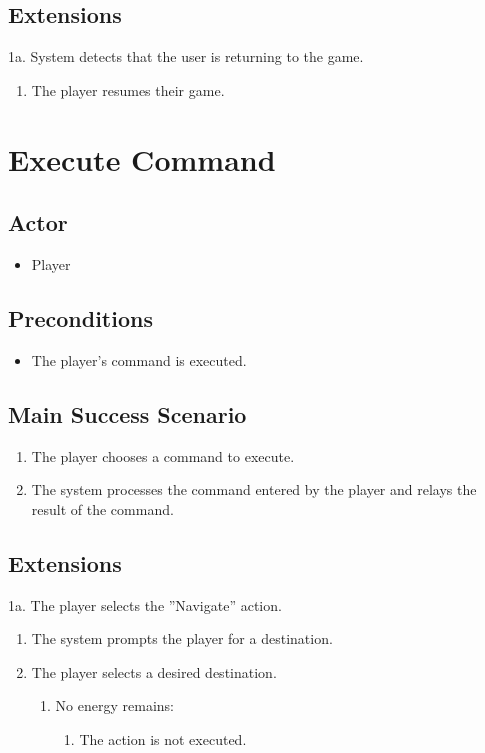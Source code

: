 \subsection{Extensions}
1a. System detects that the user is returning to the game.
\begin{enumerate}
	\item The player resumes their game.
\end{enumerate}

\section{Execute Command}

\subsection{Actor}
\begin{itemize}
	\item Player
\end{itemize}

\subsection{Preconditions}
\begin{itemize}
	\item The player's command is executed.
\end{itemize}

\subsection{Main Success Scenario}
\begin{enumerate}
	\item The player chooses a command to execute.
	\item The system processes the command entered by the player and relays the result of the command.
\end{enumerate}

\subsection{Extensions}
1a. The player selects the ''Navigate'' action.
\begin{enumerate}
	\item The system prompts the player for a destination.
	\item The player selects a desired destination.
		\begin{enumerate}
			\item No energy remains:
				\begin{enumerate}
					\item The action is not executed.
				\end{enumerate}
		\end{enumerate}
\end{enumerate}

